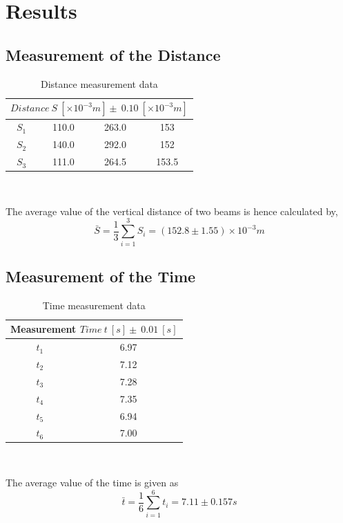 \documentclass[12pt]{article}
\begin{document}
        \section{Results}
        \subsection{Measurement of the Distance}
        \begin{table}[h]
        \centering
        \begin{tabular}{|c|c|c|c|}
            \hline
            \multicolumn{4}{|c|}{$Distance\ S\ [\times10^{-3}m] \pm\ 0.10\ [\times10^{-3}m]$}\\
            \hline
            $S_1$ &110.0 & 263.0 &153\\
            \hline
            $S_2$ &140.0 &292.0 &152\\
            \hline
            $S_3$ &111.0 &264.5 &153.5\\     
            \hline
        \end{tabular}\\
        \caption{Distance measurement data}
        \label{distance}
        \end{table}
        The average value of the vertical distance of two beams is hence calculated by,
        $$\bar{S}=\frac{1}{3}\sum_{i=1}^{3}S_i=(152.8\pm1.55)\times10^{-3}m$$
        \subsection{Measurement of the Time}
        \begin{table}[htbp]
        \centering
        \begin{tabular}{|c|c|}
            \hline
            \multicolumn{2}{|c|}{Measurement $Time\ t\ [s] \pm\ 0.01\ [s]$}\\
            \hline
            $t_1$ & 6.97\\
            \hline
            $t_2$ & 7.12\\
            \hline
            $t_3$ & 7.28\\
            \hline
            $t_4$ & 7.35\\
            \hline
            $t_5$ & 6.94\\
            \hline
            $t_6$ & 7.00\\
            \hline
        \end{tabular}\\
        \caption{Time measurement data}
        \label{time}
    \end{table}
    The average value of the time is given as
    \[
        \bar{t}=\frac{1}{6}\sum_{i=1}^{6}t_i=7.11\pm 0.157s
    \]
\end{document}
